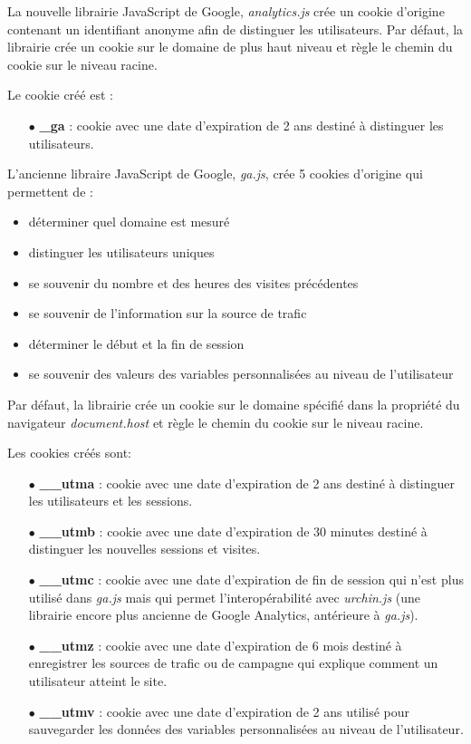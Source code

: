 La nouvelle librairie JavaScript de Google, \textit{analytics.js} crée un cookie d'origine contenant un identifiant anonyme afin de distinguer les utilisateurs. Par défaut, la librairie crée un cookie sur le domaine de plus haut niveau et règle le chemin du cookie sur le niveau racine.

Le cookie créé est :
\begin{itemize}
  \item[$\bullet$] \textbf{\_ga} : cookie avec une date d'expiration de 2 ans destiné à distinguer les utilisateurs.
  \newline
\end{itemize}

L'ancienne libraire JavaScript de Google, \textit{ga.js}, crée 5 cookies d'origine qui permettent de :
\begin{itemize}
  \item déterminer quel domaine est mesuré
  \item distinguer les utilisateurs uniques
  \item se souvenir du nombre et des heures des visites précédentes
  \item se souvenir de l'information sur la source de trafic
  \item déterminer le début et la fin de session
  \item se souvenir des valeurs des variables personnalisées au niveau de l'utilisateur
\end{itemize}

Par défaut, la librairie crée un cookie sur le domaine spécifié dans la propriété du navigateur \textit{document.host} et règle le chemin du cookie sur le niveau racine.

Les cookies créés sont:
\begin{itemize}
  \item[$\bullet$] \textbf{\_\_utma} : cookie avec une date d'expiration de 2 ans destiné à distinguer les utilisateurs et les sessions.
  \item[$\bullet$] \textbf{\_\_utmb} : cookie avec une date d'expiration de 30 minutes destiné à distinguer les nouvelles sessions et visites.
  \item[$\bullet$] \textbf{\_\_utmc} : cookie avec une date d'expiration de fin de session qui n'est plus utilisé dans \textit{ga.js} mais qui permet l'interopérabilité avec \textit{urchin.js} (une librairie encore plus ancienne de Google Analytics, antérieure à \textit{ga.js}).
  \item[$\bullet$] \textbf{\_\_utmz} : cookie avec une date d'expiration de 6 mois destiné à enregistrer les sources de trafic ou de campagne qui explique comment un utilisateur atteint le site.
  \item[$\bullet$] \textbf{\_\_utmv} : cookie avec une date d'expiration de 2 ans utilisé pour sauvegarder les données des variables personnalisées au niveau de l'utilisateur.
  \newline
\end{itemize}


